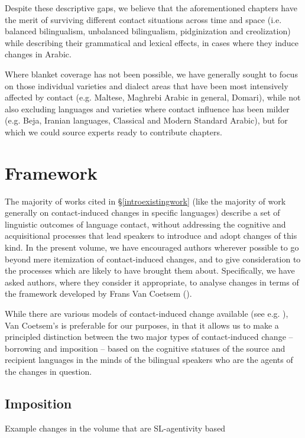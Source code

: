 \documentclass[output=paper]{langsci/langscibook}
\begin{document}
Despite these descriptive gaps, we believe that the aforementioned chapters have the merit of surviving different contact situations across time and space (i.e. balanced bilingualism, unbalanced bilingualism, pidginization and creolization) while describing their grammatical and lexical effects, in cases where they induce changes in Arabic.


 Where blanket coverage has not been possible, we have generally sought to focus on those individual varieties and dialect areas that have been most intensively affected by contact (e.g. Maltese, Maghrebi Arabic in general, Domari), while not also excluding languages and varieties where contact influence has been milder (e.g. Beja, Iranian languages, Classical and Modern Standard Arabic), but for which we could source experts ready to contribute chapters.

\section{Framework}\label{introvc}
The majority of works cited in §\ref{introexistingwork} (like the majority of work generally on contact-induced changes in specific languages) describe a set of linguistic outcomes of language contact, without addressing the cognitive and acquisitional processes that lead speakers to introduce and adopt changes of this kind. In the present volume, we have encouraged authors wherever possible to go beyond mere itemization of contact-induced changes, and to give consideration to the processes which are likely to have brought them about. Specifically, we have asked authors, where they consider it appropriate, to analyse changes in terms of the framework developed by Frans Van Coetsem (\citeyear{VanCoetsem1988,VanCoetsem2000}).

While there are various models of contact-induced change available (see e.g. \citealt{ThomasonKaufman1988,Johanson2002,Matras2009}), Van Coetsem's is preferable for our purposes, in that it allows us to make a principled distinction between the two major types of contact-induced change -- borrowing and imposition -- based on the cognitive statuses of the source and recipient languages in the minds of the bilingual speakers who are the agents of the changes in question.

\subsection{Imposition}
Example changes in the volume that are SL-agentivity based
\end{document}
